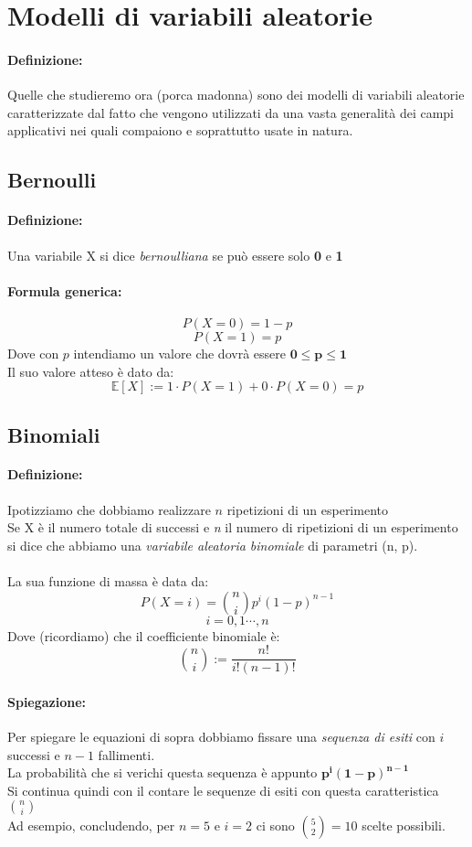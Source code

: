 \documentclass[]{article}
\newcommand{\ev}{\mathbb{E}[X]}
\renewcommand{\ev}[1]{\mathbb{E}[#1]}
\newcommand{\definizione}{\paragraph{Definizione:}}
\newcommand{\formula}{\paragraph{Formula generica:}}
\begin{document}
    \newpage
    \section{Modelli di variabili aleatorie}
    \definizione Quelle che studieremo ora (porca madonna) sono dei modelli di variabili aleatorie caratterizzate 
    dal fatto che vengono utilizzati da una vasta generalità dei campi applicativi nei quali compaiono e soprattutto usate in natura.
    \subsection{Bernoulli}
    \definizione Una variabile X si dice \textit{bernoulliana} se può essere solo \textbf{0} e \textbf{1}
    \formula 
    \[ P(X = 0) = 1 - p \]
    \[ P(X = 1) = p \]
    Dove con $p$ intendiamo un valore che dovrà essere $\boldsymbol{0 \leq p \leq 1}$ \\
    Il suo valore atteso è dato da:
    \[ \ev{X} := 1 \cdot P(X = 1) + 0 \cdot P(X = 0) = p \]


    \subsection{Binomiali}
    \definizione Ipotizziamo che dobbiamo realizzare $n$ ripetizioni di un esperimento \\
    Se X è il numero totale di successi e \textit{n} il numero di ripetizioni di un esperimento \\
    si dice che abbiamo una
    \textit{variabile aleatoria binomiale} di parametri (n, p). \\ \\
    La sua funzione di massa è data da:
    \[ P(X = i) = \binom{n}{i}p^i (1-p)^{n-1}  \]
    \[ i = 0,1 \cdots, n \]
    Dove (ricordiamo) che il coefficiente binomiale è:
    \[ \binom{n}{i} := \frac{n!}{i!(n-1)!} \] 
    \paragraph{Spiegazione:} Per spiegare le equazioni di sopra dobbiamo fissare una \textit{sequenza di esiti} con $i$ successi e $n - 1$ fallimenti. \\
    La probabilità che si verichi questa sequenza è appunto $\boldsymbol{p^i(1-p)^{n-1}}$ \\
    Si continua quindi con il contare le sequenze di esiti con questa caratteristica $\binom{n}{i}$ \\ 
    Ad esempio, concludendo, per $n = 5$ e $i = 2$ ci sono $\binom{5}{2} = 10$ scelte possibili. \\
\end{document}
